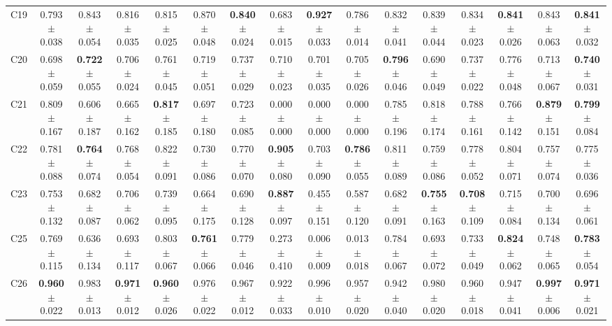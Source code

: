 \begin{table}
{\begin{tabular}{lccccccccccccccc}
C19 & 0.793 $\pm$ 0.038 & 0.843 $\pm$ 0.054 & 0.816 $\pm$ 0.035 & 0.815 $\pm$ 0.025 & 0.870 $\pm$ 0.048 & \textbf{0.840} $\pm$ 0.024 & 0.683 $\pm$ 0.015 & \textbf{0.927} $\pm$ 0.033 & 0.786 $\pm$ 0.014 & 0.832 $\pm$ 0.041 & 0.839 $\pm$ 0.044 & 0.834 $\pm$ 0.023 & \textbf{0.841} $\pm$ 0.026 & 0.843 $\pm$ 0.063 & \textbf{0.841} $\pm$ 0.032 \\
C20 & 0.698 $\pm$ 0.059 & \textbf{0.722} $\pm$ 0.055 & 0.706 $\pm$ 0.024 & 0.761 $\pm$ 0.045 & 0.719 $\pm$ 0.051 & 0.737 $\pm$ 0.029 & 0.710 $\pm$ 0.023 & 0.701 $\pm$ 0.035 & 0.705 $\pm$ 0.026 & \textbf{0.796} $\pm$ 0.046 & 0.690 $\pm$ 0.049 & 0.737 $\pm$ 0.022 & 0.776 $\pm$ 0.048 & 0.713 $\pm$ 0.067 & \textbf{0.740} $\pm$ 0.031 \\
C21 & 0.809 $\pm$ 0.167 & 0.606 $\pm$ 0.187 & 0.665 $\pm$ 0.162 & \textbf{0.817} $\pm$ 0.185 & 0.697 $\pm$ 0.180 & 0.723 $\pm$ 0.085 & 0.000 $\pm$ 0.000 & 0.000 $\pm$ 0.000 & 0.000 $\pm$ 0.000 & 0.785 $\pm$ 0.196 & 0.818 $\pm$ 0.174 & 0.788 $\pm$ 0.161 & 0.766 $\pm$ 0.142 & \textbf{0.879} $\pm$ 0.151 & \textbf{0.799} $\pm$ 0.084 \\
C22 & 0.781 $\pm$ 0.088 & \textbf{0.764} $\pm$ 0.074 & 0.768 $\pm$ 0.054 & 0.822 $\pm$ 0.091 & 0.730 $\pm$ 0.086 & 0.770 $\pm$ 0.070 & \textbf{0.905} $\pm$ 0.080 & 0.703 $\pm$ 0.090 & \textbf{0.786} $\pm$ 0.055 & 0.811 $\pm$ 0.089 & 0.759 $\pm$ 0.086 & 0.778 $\pm$ 0.052 & 0.804 $\pm$ 0.071 & 0.757 $\pm$ 0.074 & 0.775 $\pm$ 0.036 \\
C23 & 0.753 $\pm$ 0.132 & 0.682 $\pm$ 0.087 & 0.706 $\pm$ 0.062 & 0.739 $\pm$ 0.095 & 0.664 $\pm$ 0.175 & 0.690 $\pm$ 0.128 & \textbf{0.887} $\pm$ 0.097 & 0.455 $\pm$ 0.151 & 0.587 $\pm$ 0.120 & 0.682 $\pm$ 0.091 & \textbf{0.755} $\pm$ 0.163 & \textbf{0.708} $\pm$ 0.109 & 0.715 $\pm$ 0.084 & 0.700 $\pm$ 0.134 & 0.696 $\pm$ 0.061 \\
C25 & 0.769 $\pm$ 0.115 & 0.636 $\pm$ 0.134 & 0.693 $\pm$ 0.117 & 0.803 $\pm$ 0.067 & \textbf{0.761} $\pm$ 0.066 & 0.779 $\pm$ 0.046 & 0.273 $\pm$ 0.410 & 0.006 $\pm$ 0.009 & 0.013 $\pm$ 0.018 & 0.784 $\pm$ 0.067 & 0.693 $\pm$ 0.072 & 0.733 $\pm$ 0.049 & \textbf{0.824} $\pm$ 0.062 & 0.748 $\pm$ 0.065 & \textbf{0.783} $\pm$ 0.054 \\
C26 & \textbf{0.960} $\pm$ 0.022 & 0.983 $\pm$ 0.013 & \textbf{0.971} $\pm$ 0.012 & \textbf{0.960} $\pm$ 0.026 & 0.976 $\pm$ 0.022 & 0.967 $\pm$ 0.012 & 0.922 $\pm$ 0.033 & 0.996 $\pm$ 0.010 & 0.957 $\pm$ 0.020 & 0.942 $\pm$ 0.040 & 0.980 $\pm$ 0.020 & 0.960 $\pm$ 0.018 & 0.947 $\pm$ 0.041 & \textbf{0.997} $\pm$ 0.006 & \textbf{0.971} $\pm$ 0.021 \\

\end{tabular}}
\end{table}
